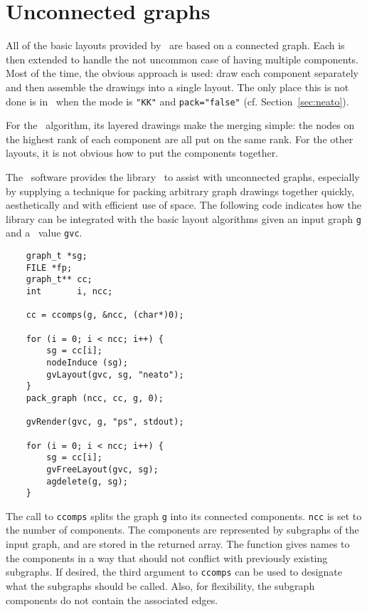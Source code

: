 \section{Unconnected graphs}
\label{sec:unconnect}
All of the basic layouts provided by \gviz\ are based on a connected graph.
Each is then extended to handle the not uncommon case of having
multiple components. Most of the time, the obvious approach is used:
draw each component separately and then assemble the drawings into a single
layout. The only place this is not done is in \neato\ when the mode is
{\tt "KK"} and {\tt pack="false"} (cf. Section~\ref{sec:neato}).

For the \dot\ algorithm, its layered drawings make the merging simple:
the nodes on the highest rank of each component are all put
on the same rank. For the other layouts, it is not obvious how to put
the components together. 

The \gviz\ software provides the library \pack\ to assist
with unconnected graphs, especially by supplying a technique for
packing arbitrary graph drawings together quickly, aesthetically and
with efficient use of space. The following code indicates how the
library can be integrated with the 
basic layout algorithms given an input graph {\tt g} and a \gvc\ value
{\tt gvc}.

\begin{verbatim}
    graph_t *sg;
    FILE *fp;
    graph_t** cc;
    int       i, ncc;

    cc = ccomps(g, &ncc, (char*)0);

    for (i = 0; i < ncc; i++) {
	    sg = cc[i];
        nodeInduce (sg);
        gvLayout(gvc, sg, "neato");
    }
    pack_graph (ncc, cc, g, 0);

    gvRender(gvc, g, "ps", stdout);

    for (i = 0; i < ncc; i++) {
        sg = cc[i];
        gvFreeLayout(gvc, sg);
        agdelete(g, sg);
    }
\end{verbatim}

The call to {\tt ccomps} splits the graph {\tt g} into its connected
components. {\tt ncc} is set to the number of components. 
The components are represented by subgraphs of the input graph, and are
stored in the returned array. The function gives names to the components
in a way that should not conflict with previously existing subgraphs.
If desired, the third argument to {\tt ccomps} can be used to designate
what the subgraphs should be called. Also, for flexibility, the
subgraph components do not contain the associated edges.

